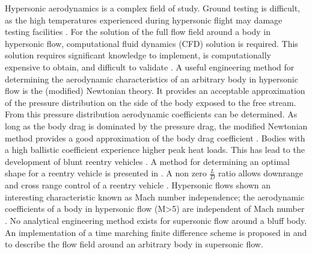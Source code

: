 Hypersonic aerodynamics is a complex field of study. Ground testing is difficult, as the high temperatures experienced during hypersonic flight may damage testing facilities \cite{Anderson2002} \cite{Bertin1994}. For the solution of the full flow field around a body in hypersonic flow, computational fluid dynamics (CFD) solution is required. This solution requires significant knowledge to implement, is computationally expensive to obtain, and difficult to validate \cite{Anderson2002} \cite{Bertin1994}. A useful engineering method for determining the aerodynamic characteristics of an arbitrary body in hypersonic flow is the (modified) Newtonian theory. It provides an acceptable approximation of the pressure distribution on the side of the body exposed to the free stream. From this pressure distribution aerodynamic coefficients can be determined. As long as the body drag is dominated by the pressure drag, the modified Newtonian method provides a good approximation of the body drag coefficient \cite{Anderson2002} \cite{Bertin1994} \cite{Bertin2006}. Bodies with a high ballistic coefficient experience higher peak heat loads. This has lead to the development of blunt reentry vehicles\cite{Bertin1994} \cite{Theisinger2009}. A method for determining an optimal shape for a reentry vehicle is presented in \cite{Theisinger2009}. A non zero $\frac{L}{D}$ ratio allows downrange and cross range control of a reentry vehicle \cite{Theisinger2009}. Hypersonic flows shown an interesting characteristic known as Mach number independence; the aerodynamic coefficients of a body in hypersonic flow (M>5) are independent of Mach number \cite{Bertin1994,AndersonJr.2007,Hollis}. No analytical engineering method exists for supersonic flow around a bluff body. An implementation of a time marching finite difference scheme is proposed in \cite{AndersonJr.2007} and \cite{AndersonJr.2006} to describe the flow field around an arbitrary body in supersonic  flow. 



